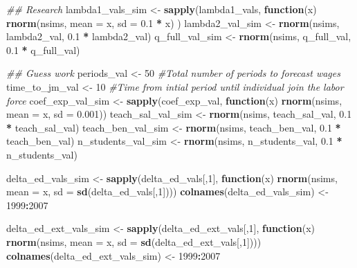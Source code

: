 \documentclass[]{article}
\newenvironment{Shaded}{\begin{snugshade}}{\end{snugshade}}
\newcommand{\CommentTok}[1]{\textcolor[rgb]{0.56,0.35,0.01}{\textit{#1}}}
\newcommand{\ControlFlowTok}[1]{\textcolor[rgb]{0.13,0.29,0.53}{\textbf{#1}}}
\newcommand{\DataTypeTok}[1]{\textcolor[rgb]{0.13,0.29,0.53}{#1}}
\newcommand{\DecValTok}[1]{\textcolor[rgb]{0.00,0.00,0.81}{#1}}
\newcommand{\FloatTok}[1]{\textcolor[rgb]{0.00,0.00,0.81}{#1}}
\newcommand{\KeywordTok}[1]{\textcolor[rgb]{0.13,0.29,0.53}{\textbf{#1}}}
\newcommand{\NormalTok}[1]{#1}
\newcommand{\OperatorTok}[1]{\textcolor[rgb]{0.81,0.36,0.00}{\textbf{#1}}}
\newcommand{\StringTok}[1]{\textcolor[rgb]{0.31,0.60,0.02}{#1}}
\begin{document}
\begin{Shaded}
\begin{Highlighting}[]
\CommentTok{## Research}
\NormalTok{lambda1_vals_sim <-}\StringTok{ }\KeywordTok{sapply}\NormalTok{(lambda1_vals, }\ControlFlowTok{function}\NormalTok{(x)  }\KeywordTok{rnorm}\NormalTok{(nsims, }\DataTypeTok{mean =}\NormalTok{ x, }\DataTypeTok{sd =} \FloatTok{0.1} \OperatorTok{*}\StringTok{ }\NormalTok{x) )}
\NormalTok{lambda2_val_sim <-}\StringTok{ }\KeywordTok{rnorm}\NormalTok{(nsims, lambda2_val, }\FloatTok{0.1} \OperatorTok{*}\StringTok{ }\NormalTok{lambda2_val)}
\NormalTok{q_full_val_sim <-}\StringTok{ }\KeywordTok{rnorm}\NormalTok{(nsims, q_full_val, }\FloatTok{0.1} \OperatorTok{*}\StringTok{ }\NormalTok{q_full_val)}

\CommentTok{## Guess work}
\NormalTok{periods_val <-}\StringTok{ }\DecValTok{50}           \CommentTok{#Total number of periods to forecast wages}
\NormalTok{time_to_jm_val <-}\StringTok{ }\DecValTok{10}        \CommentTok{#Time from intial period until individual join the labor force}
\NormalTok{coef_exp_val_sim <-}\StringTok{  }\KeywordTok{sapply}\NormalTok{(coef_exp_val, }\ControlFlowTok{function}\NormalTok{(x)  }\KeywordTok{rnorm}\NormalTok{(nsims, }\DataTypeTok{mean =}\NormalTok{ x, }\DataTypeTok{sd =} \FloatTok{0.001}\NormalTok{))}
\NormalTok{teach_sal_val_sim <-}\StringTok{ }\KeywordTok{rnorm}\NormalTok{(nsims, teach_sal_val, }\FloatTok{0.1} \OperatorTok{*}\StringTok{ }\NormalTok{teach_sal_val)}
\NormalTok{teach_ben_val_sim <-}\StringTok{ }\KeywordTok{rnorm}\NormalTok{(nsims, teach_ben_val, }\FloatTok{0.1} \OperatorTok{*}\StringTok{ }\NormalTok{teach_ben_val)}
\NormalTok{n_students_val_sim <-}\StringTok{ }\KeywordTok{rnorm}\NormalTok{(nsims, n_students_val, }\FloatTok{0.1} \OperatorTok{*}\StringTok{ }\NormalTok{n_students_val)}

\NormalTok{delta_ed_vals_sim <-}\StringTok{ }\KeywordTok{sapply}\NormalTok{(delta_ed_vals[,}\DecValTok{1}\NormalTok{], }\ControlFlowTok{function}\NormalTok{(x)  }\KeywordTok{rnorm}\NormalTok{(nsims, }\DataTypeTok{mean =}\NormalTok{ x, }\DataTypeTok{sd =} \KeywordTok{sd}\NormalTok{(delta_ed_vals[,}\DecValTok{1}\NormalTok{])))}
\KeywordTok{colnames}\NormalTok{(delta_ed_vals_sim) <-}\StringTok{ }\DecValTok{1999}\OperatorTok{:}\DecValTok{2007}

\NormalTok{delta_ed_ext_vals_sim <-}\StringTok{ }\KeywordTok{sapply}\NormalTok{(delta_ed_ext_vals[,}\DecValTok{1}\NormalTok{], }\ControlFlowTok{function}\NormalTok{(x)  }\KeywordTok{rnorm}\NormalTok{(nsims, }\DataTypeTok{mean =}\NormalTok{ x, }\DataTypeTok{sd =} \KeywordTok{sd}\NormalTok{(delta_ed_ext_vals[,}\DecValTok{1}\NormalTok{])))}
\KeywordTok{colnames}\NormalTok{(delta_ed_ext_vals_sim) <-}\StringTok{ }\DecValTok{1999}\OperatorTok{:}\DecValTok{2007}


\end{Highlighting}
\end{Shaded}
\end{document}
